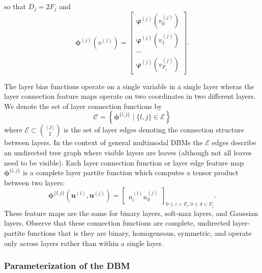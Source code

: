 \documentclass{article} %
\begin{document}
so that $D_j=2F_j$ and
\begin{equation}
\boldsymbol{\phi}^{(j)}(v^{(j)}) = \begin{bmatrix} \boldsymbol{\varphi}^{(j)}(v^{(j)}_0) \\ \boldsymbol{\varphi}^{(j)}(v^{(j)}_1) \\ \cdots \\ \boldsymbol{\varphi}^{(j)}(v^{(j)}_{F_j}) \end{bmatrix}.
\end{equation}

The layer bias functions operate on a single variable in a single layer wheras the layer connection feature maps operate on two coordinates
in two different layers.  We denote the set of layer connection functions by
\begin{equation}
\mathcal{C} = \left\{ \boldsymbol{\phi}^{\{l,j\}} \mid \{l,j\} \in\mathcal{E}\right\}
\end{equation}
where $\mathcal{E}\subset { [J] \choose 2 }$ is the set of layer edges denoting the connection structure between layers.  In the
context of general multimodal DBMs the $\mathcal{E}$ edges describe an undirected tree graph where visible layers are leaves (although
not all leaves need to be visible).  Each layer connection function or layer edge feature map $\boldsymbol{\phi}^{\{l,j\}}$ is a complete
layer partite function which computes a tensor product between two layers:
\begin{equation}
\boldsymbol{\phi}^{\{l,j\}}(\mathbf{u}^{(l)},\mathbf{u}^{(j)}) = \begin{bmatrix} u^{(l)}_i u^{(j)}_d \end{bmatrix}_{0\leq i < F_l,0\leq d < F_j}.
\end{equation}
These feature maps are the same for binary layers, soft-max layers,
and Gaussian layers.  Observe that these
connection functions are complete, undirected layer-partite functions
that is they are binary, homogeneous, symmetric, and operate only
across layers rather than within a single layer.

\subsubsection{Parameterization of the DBM}
\end{document}
